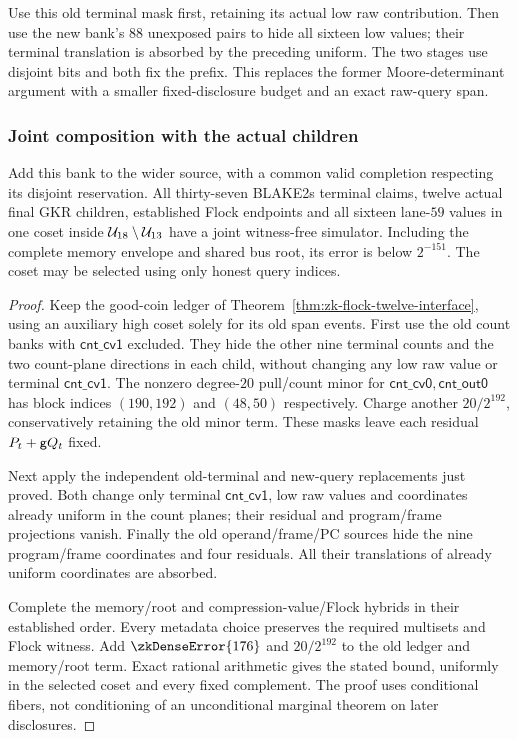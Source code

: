 Use this old terminal mask first, retaining its actual low raw contribution. Then use the new bank's $88$ unexposed pairs to hide all sixteen low values; their terminal translation is absorbed by the preceding uniform. The two stages use disjoint bits and both fix the prefix. This replaces the former Moore-determinant argument with a smaller fixed-disclosure budget and an exact raw-query span.

\subsubsection{Joint composition with the actual children}

\begin{theorem}\label{thm:zk-lowbank-interface}
Add this bank to the wider source, with a common valid completion respecting its disjoint reservation. All thirty-seven BLAKE2s terminal claims, twelve actual final GKR children, established Flock endpoints and all sixteen lane-$59$ values in one coset inside $\mathcal{U}_{18}\setminus\mathcal{U}_{13}$ have a joint witness-free simulator. Including the complete memory envelope and shared bus root, its error is below $2^{-151}$. The coset may be selected using only honest query indices.
\end{theorem}
\begin{proof}
Keep the good-coin ledger of Theorem~\ref{thm:zk-flock-twelve-interface}, using an auxiliary high coset solely for its old span events. First use the old count banks with $\mathsf{cnt\_cv1}$ excluded. They hide the other nine terminal counts and the two count-plane directions in each child, without changing any low raw value or terminal $\mathsf{cnt\_cv1}$. The nonzero degree-$20$ pull/count minor for $\mathsf{cnt\_cv0},\mathsf{cnt\_out0}$ has block indices $(190,192)$ and $(48,50)$ respectively. Charge another $20/2^{192}$, conservatively retaining the old minor term. These masks leave each residual $P_t+\mathsf{g} Q_t$ fixed.

Next apply the independent old-terminal and new-query replacements just proved. Both change only terminal $\mathsf{cnt\_cv1}$, low raw values and coordinates already uniform in the count planes; their residual and program/frame projections vanish. Finally the old operand/frame/PC sources hide the nine program/frame coordinates and four residuals. All their translations of already uniform coordinates are absorbed.

Complete the memory/root and compression-value/Flock hybrids in their established order. Every metadata choice preserves the required multisets and Flock witness. Add $\zkDenseError{176}$ and $20/2^{192}$ to the old ledger and memory/root term. Exact rational arithmetic gives the stated bound, uniformly in the selected coset and every fixed complement. The proof uses conditional fibers, not conditioning of an unconditional marginal theorem on later disclosures.
\end{proof}

